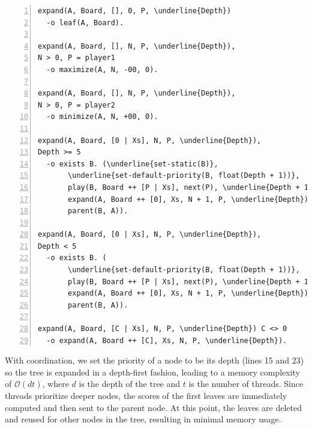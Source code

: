 \begin{topfig}
\scriptsize\begin{Verbatim}[numbers=left,commandchars=\\\{\}]
expand(A, Board, [], 0, P, \underline{Depth})
  -o leaf(A, Board).

expand(A, Board, [], N, P, \underline{Depth}),
N > 0, P = player1
  -o maximize(A, N, -00, 0).

expand(A, Board, [], N, P, \underline{Depth}),
N > 0, P = player2
  -o minimize(A, N, +00, 0).

expand(A, Board, [0 | Xs], N, P, \underline{Depth}),
Depth >= 5
  -o exists B. (\underline{set-static(B)},
       \underline{set-default-priority(B, float(Depth + 1))},
       play(B, Board ++ [P | Xs], next(P), \underline{Depth + 1}),
       expand(A, Board ++ [0], Xs, N + 1, P, \underline{Depth}),
       parent(B, A)).

expand(A, Board, [0 | Xs], N, P, \underline{Depth}),
Depth < 5
  -o exists B. (
       \underline{set-default-priority(B, float(Depth + 1))},
       play(B, Board ++ [P | Xs], next(P), \underline{Depth + 1}),
       expand(A, Board ++ [0], Xs, N + 1, P, \underline{Depth}),
       parent(B, A)).

expand(A, Board, [C | Xs], N, P, \underline{Depth}) C <> 0
  -o expand(A, Board ++ [C], Xs, N, P, \underline{Depth}).
\end{Verbatim}
\vspace*{-2ex}
\end{topfig}
\normalsize

With coordination, we set the priority of a node to be its depth (lines 15 and
23) so the tree is expanded in a depth-first fashion,
leading to a memory complexity of $\mathcal{O}(d t)$, where $d$
is the depth of the tree and $t$ is the number of threads.
Since threads prioritize deeper nodes, the scores of the first leaves are immediately
computed and then sent to the parent node. At this point, the leaves are deleted
and reused for other nodes in the tree, resulting in minimal memory usage.

